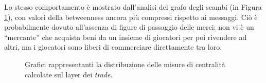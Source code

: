 Lo stesso comportamento è mostrato dall'analisi del grafo degli scambi (in Figura \ref{fig:trades_centrality}), con valori della betweenness ancora più compressi rispetto ai messaggi. Ciò è probabilmente dovuto all'assenza di figure di passaggio delle merci: non vi è un “mercante” che acquista beni da un insieme di giocatori per poi rivendere ad altri, ma i giocatori sono liberi di commerciare direttamente tra loro.
\begin{figure}
	\hfill
	\caption{Grafici rappresentanti la distribuzione delle misure di centralità calcolate sul layer dei \textit{trade}.}
	\label{fig:trades_centrality}
\end{figure}


